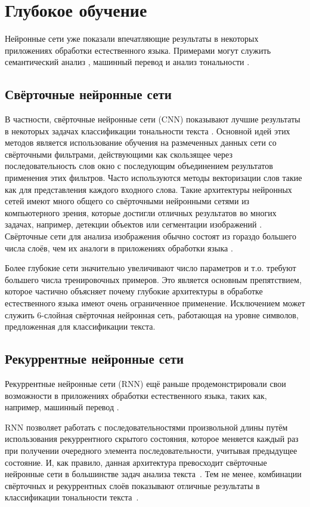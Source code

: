 \section{Глубокое обучение}
Нейронные сети уже показали впечатляющие результаты в некоторых приложениях обработки естественного языка. Примерами могут служить семантический анализ \cite{Shen}, машинный перевод \cite{Gao} и анализ тональности \cite{socher-rdm}.

\subsection{Свёрточные нейронные сети}
В частности, свёрточные нейронные сети (CNN) показывают лучшие результаты в некоторых задачах классификации тональности текста \cite{Johnson, Kim, Severyn31}. Основной идей этих методов является использование обучения на размеченных данных сети со свёрточными фильтрами, действующими как скользящее через последовательность слов окно с последующим объединением результатов применения этих фильтров. Часто используются методы векторизации слов такие как \cite{word2vec, Pennington} для представления каждого входного слова. Такие архитектуры нейронных сетей имеют много общего со свёрточными нейронными сетями из компьютерного зрения, которые достигли отличных результатов во многих задачах, например, детекции объектов \cite{Szegedy37} или сегментации изображений \cite{Long}. Свёрточные сети для анализа изображения обычно состоят из гораздо большего числа слоёв, чем их аналоги в приложениях обработки языка \cite{Szegedy37}. 

Более глубокие сети значительно увеличивают число параметров и т.о. требуют большего числа тренировочных примеров. Это является основным препятствием, которое частично объясняет почему глубокие архитектуры в обработке естественного языка имеют очень ограниченное применение. Исключением может служить 6-слойная свёрточная нейронная сеть, работающая на уровне символов, предложенная \cite{Zhang} для классификации текста.

\subsection{Рекуррентные нейронные сети}
Рекуррентные нейронные сети (RNN) ещё раньше продемонстрировали свои возможности в приложениях обработки естественного языка, таких как, например, машинный перевод \cite{Auli, Sutskever, Liu-rnn}.

RNN позволяет работать с последовательностями произвольной длины путём использования рекуррентного скрытого состояния, которое меняется каждый раз при получении очередного элемента последовательности, учитывая предыдущее состояние. И, как правило, данная архитектура превосходит свёрточные нейронные сети в большинстве задач анализа текста~\cite{Yin}. Тем не менее, комбинации свёрточных и рекуррентных слоёв показывают отличные результаты в классификации тональности текста~\cite{Tang, Wang2}.

